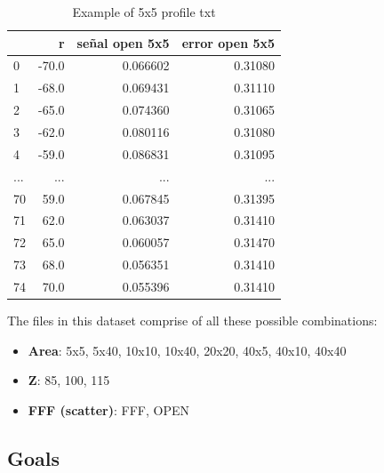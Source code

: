 \documentclass[openany]{article}
\begin{document}
\begin{table}[!h]
    \centering
\begin{tabular}{lrrr}
\toprule
{} &     \textbf{r} &  \textbf{señal open 5x5} &  \textbf{error open 5x5} \\
\midrule
\hline
\hline

0 & -70.0 &        0.066602 &         0.31080 \\
1 & -68.0 &        0.069431 &         0.31110 \\
2 & -65.0 &        0.074360 &         0.31065 \\
3 & -62.0 &        0.080116 &         0.31080 \\
4 & -59.0 &        0.086831 &         0.31095 \\
... & ... & ... & ... \\
70 &  59.0 &        0.067845 &         0.31395 \\
71 &  62.0 &        0.063037 &         0.31410 \\
72 &  65.0 &        0.060057 &         0.31470 \\
73 &  68.0 &        0.056351 &         0.31410 \\
74 &  70.0 &        0.055396 &         0.31410 \\
\hline
\hline

\bottomrule
\end{tabular}
\caption{Example of 5x5 profile txt}
    \label{tab:my_label}
\end{table}

\newpage 

The files in this dataset comprise of all these possible combinations:

\begin{itemize}
    \item \textbf{Area}: 5x5, 5x40, 10x10, 10x40, 20x20, 40x5, 40x10, 40x40
    \item \textbf{Z}: 85, 100, 115
    \item \textbf{FFF (scatter)}: FFF, OPEN
\end{itemize}


\newpage 

\subsection{Goals}
\end{document}
